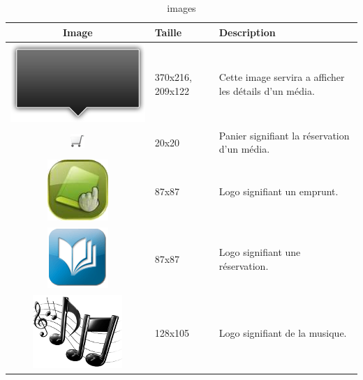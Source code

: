 \documentclass[letter, 11pt, draft]{report}
\begin{document}
\begin{table}[ht]
	\caption{images}
	\begin{center}
		\begin{tabular}{|c|l|l|}
		\hline
		Image 		& Taille 			& Description \\ \hline
		\includegraphics[scale=0.2]{black_arrow_big.png} 	& 370x216, 209x122 	& Cette image servira a afficher les détails d'un média. \\ \hline
		\includegraphics{cart.png} 							& 20x20 			& Panier signifiant la réservation d'un média. \\ \hline
		\includegraphics[scale=1.15]{emprunt.png} 			& 87x87 			& Logo signifiant un emprunt. \\ \hline
		\includegraphics[scale=0.3]{reservation.png} 		& 87x87 			& Logo signifiant une réservation. \\ \hline
		\includegraphics[scale=0.3]{musique.png} 			& 128x105 			& Logo signifiant de la musique. \\ \hline

\end{tabular}
\end{center}
\end{table}
\end{document}
